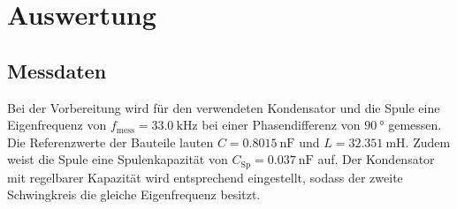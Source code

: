 \section{Auswertung}
\label{sec:Auswertung}

\subsection{Messdaten}
Bei der Vorbereitung wird für den verwendeten Kondensator und die Spule eine Eigenfrequenz von 
$f_{\text{mess}}=\SI{33.0}{\kilo\hertz}$ bei einer Phasendifferenz von $\SI{90}{\degree}$ gemessen. 
Die Referenzwerte der Bauteile lauten $C=\SI{0.8015}{\nano\farad}$ und $L=\SI{32.351}{\m\henry}$. 
Zudem weist die Spule eine Spulenkapazität von $C_\text{Sp}=\SI{0.037}{\nano\farad}$ auf.
Der Kondensator mit regelbarer Kapazität wird entsprechend eingestellt, sodass der zweite Schwingkreis die gleiche Eigenfrequenz besitzt.


